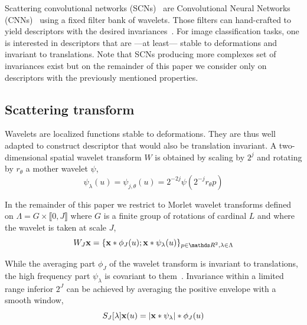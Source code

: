 \documentclass{article}
\begin{document}
		Scattering convolutional networks (SCNs)~\citep{bruna} are Convolutional Neural Networks (CNNs)~\citet{lecun1995convolutional} using a fixed filter bank of wavelets. Those filters can hand-crafted to yield descriptors with the desired invariances~\citep{work translation invariant, work rotation invariant, work rigid motion}. For image classification tasks, one is interested in descriptors that are ---at least--- stable to deformations and invariant to translations. Note that SCNs producing more complexes set of invariances exist but on the remainder of this paper we consider only on descriptors with the previously mentioned properties.
  
  \subsection{Scattering transform}
    \label{subsec:SCN/ST}
    
    Wavelets are localized functions stable to deformations. They are thus well adapted to construct descriptor that would also be translation invariant. A two-dimensional spatial wavelet transform $W$ is obtained by scaling by $2^{j}$ and rotating by $r_{\theta}$ a mother wavelet $\psi$,
    \vspace{-5pt}
    \begin{equation}
      \label{eq:multi-scale directional wavelet}
      \psi_{\lambda}(u) = \psi_{j,\theta}(u) = 2^{-2j} \psi(2^{-j}r_{\theta}p)
    \end{equation}
    
    In the remainder of this paper we restrict to Morlet wavelet transforms defined on $\Lambda = G \times \llbracket 0,J \rrbracket$ where $G$ is a finite group of rotations of cardinal $L$ and where the wavelet is taken at scale $J$,
    \vspace{-5pt}
    \begin{equation}
      \label{eq:wavelet transform}
      W_{J}\bfx = \{ \bfx \ast \phi_{J}(u); \bfx \ast \psi_{\lambda}(u) \}_{p\in\dsR^{2},\lambda \in \Lambda}
    \end{equation}
    \vspace{-15pt}

    While the averaging part $\phi_{J}$ of the wavelet transform is invariant to translations, the high frequency part $\psi_{\lambda}$ is covariant to them~\citep{mallat}. Invariance within a limited range inferior $2^{J}$ can be achieved by averaging the positive envelope with a smooth window,
    \vspace{-5pt}
    \begin{equation}
      \label{eq:Scattering transform}
      S_{J}[\lambda]{\bf x}(u) = \left| {\bf x} \ast \psi_{\lambda} \right| \ast \phi_{J}(u)
    \end{equation}
    \vspace{-10pt}
    
\end{document}
